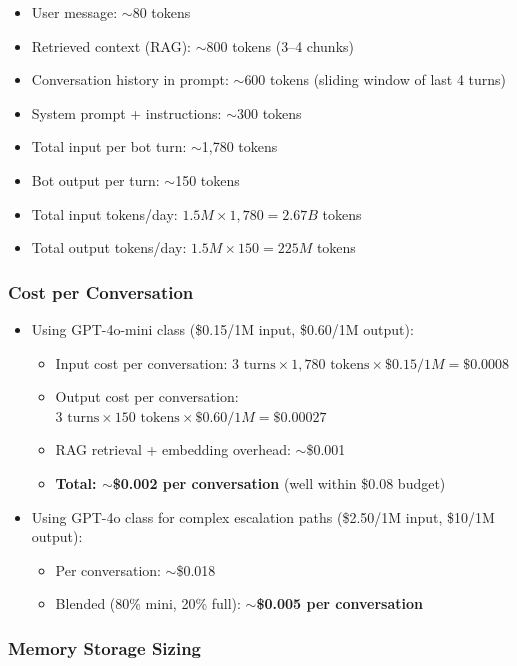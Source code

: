 \begin{itemize}
  \item User message: $\sim$80 tokens
  \item Retrieved context (RAG): $\sim$800 tokens (3--4 chunks)
  \item Conversation history in prompt: $\sim$600 tokens (sliding window of last 4 turns)
  \item System prompt + instructions: $\sim$300 tokens
  \item Total input per bot turn: $\sim$1,780 tokens
  \item Bot output per turn: $\sim$150 tokens
  \item Total input tokens/day: $1.5M \times 1{,}780 = 2.67B$ tokens
  \item Total output tokens/day: $1.5M \times 150 = 225M$ tokens
\end{itemize}

\subsubsection*{Cost per Conversation}

\begin{itemize}
  \item Using GPT-4o-mini class (\$0.15/1M input, \$0.60/1M output):
  \begin{itemize}
    \item Input cost per conversation: $3 \text{ turns} \times 1{,}780 \text{ tokens} \times \$0.15/1M = \$0.0008$
    \item Output cost per conversation: $3 \text{ turns} \times 150 \text{ tokens} \times \$0.60/1M = \$0.00027$
    \item RAG retrieval + embedding overhead: $\sim$\$0.001
    \item \textbf{Total: $\sim$\$0.002 per conversation} (well within \$0.08 budget)
  \end{itemize}
  \item Using GPT-4o class for complex escalation paths (\$2.50/1M input, \$10/1M output):
  \begin{itemize}
    \item Per conversation: $\sim$\$0.018
    \item Blended (80\% mini, 20\% full): \textbf{$\sim$\$0.005 per conversation}
  \end{itemize}
\end{itemize}

\subsubsection*{Memory Storage Sizing}

